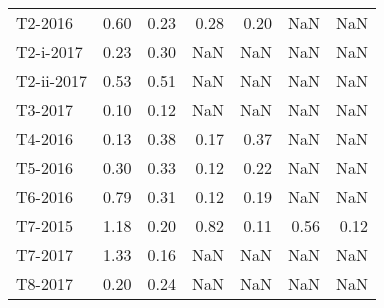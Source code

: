 \begin{tabular}{lrrrrrr}
     T2-2016 &                   0.60 &                0.23 &                   0.28 &                0.20 &                    NaN &                 NaN \\
   T2-i-2017 &                   0.23 &                0.30 &                    NaN &                 NaN &                    NaN &                 NaN \\
  T2-ii-2017 &                   0.53 &                0.51 &                    NaN &                 NaN &                    NaN &                 NaN \\
     T3-2017 &                   0.10 &                0.12 &                    NaN &                 NaN &                    NaN &                 NaN \\
     T4-2016 &                   0.13 &                0.38 &                   0.17 &                0.37 &                    NaN &                 NaN \\
     T5-2016 &                   0.30 &                0.33 &                   0.12 &                0.22 &                    NaN &                 NaN \\
     T6-2016 &                   0.79 &                0.31 &                   0.12 &                0.19 &                    NaN &                 NaN \\
     T7-2015 &                   1.18 &                0.20 &                   0.82 &                0.11 &                   0.56 &                0.12 \\
     T7-2017 &                   1.33 &                0.16 &                    NaN &                 NaN &                    NaN &                 NaN \\
     T8-2017 &                   0.20 &                0.24 &                    NaN &                 NaN &                    NaN &                 NaN \\
\bottomrule
\end{tabular}
